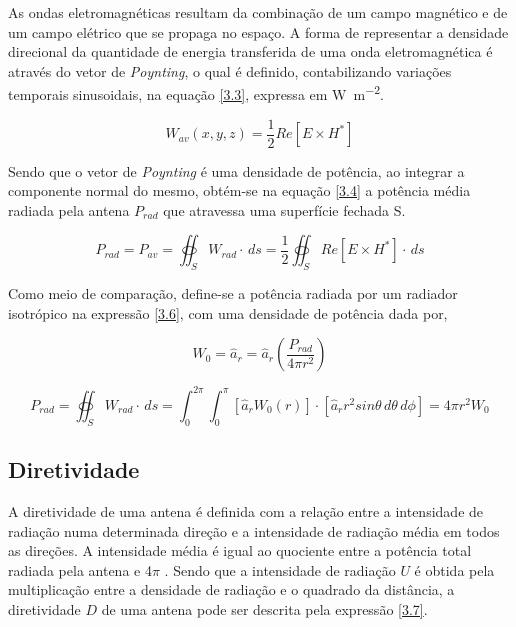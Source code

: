 As ondas eletromagnéticas resultam da combinação de um campo magnético e de um campo elétrico que se propaga no espaço. A forma de representar a densidade direcional da quantidade de energia transferida de uma onda eletromagnética é através do vetor de \textit{Poynting}, o qual é definido, contabilizando variações temporais sinusoidais, na equação \ref{3.3}, expressa em \si{\watt\per\meter\squared}.

\begin{equation} \label{3.3}
W_{av}(x,y,z)=\dfrac{1}{2}Re[E\times H^{*}]
\end{equation}

Sendo que o vetor de \textit{Poynting} é uma densidade de potência, ao integrar a componente normal do mesmo, obtém-se na equação \ref{3.4} a potência média radiada pela antena $P_{rad}$ que atravessa uma superfície fechada S.

\begin{equation} \label{3.4}
P_{rad}=P_{av}=\oiint_S W_{rad}\cdot \,ds 
=\dfrac{1}{2} \oiint_S Re[E\times H^{*}]\cdot \,ds
\end{equation}

Como meio de comparação, define-se a potência radiada por um radiador isotrópico na expressão \ref{3.6}, com uma densidade de potência dada por,

\begin{equation} \label{3.5}
W_{0}=\hat{a}_{r}=\hat{a}_{r}\left( \dfrac{P_{rad}}{4\pi r^{2}}\right) 
\end{equation}

\begin{equation} \label{3.6}
P_{rad}=\oiint_S W_{rad}\cdot \,ds 
=\int_{0}^{2\pi}\int_{0}^{\pi}\left[ \hat{a}_{r}W_{0}(r)\right] \cdot \left[ \hat{a}_{r}r^{2}sin\theta \,d\theta \,d\phi \right] = 4\pi r^{2}W_{0}
\end{equation}
 
 
\subsection*{Diretividade}
A diretividade de uma antena é definida com a relação entre a intensidade de radiação numa determinada direção e a intensidade de radiação média em todos as direções. A intensidade média é igual ao quociente entre a potência total radiada pela antena e 4$\pi$ \parencite{IEEE1997}. Sendo que a intensidade de radiação $U$ é obtida pela multiplicação entre a densidade de radiação e o quadrado da distância, a diretividade $D$ de uma antena pode ser descrita pela expressão \ref{3.7}.

